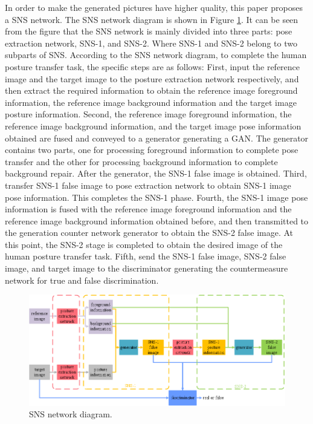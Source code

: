 In order to make the generated pictures have higher quality, this paper proposes a SNS network. The SNS network diagram is shown in Figure \ref{image02}. It can be seen from the figure that the SNS network is mainly divided into three parts: pose extraction network, SNS-1, and SNS-2. Where SNS-1 and SNS-2 belong to two subparts of SNS. According to the SNS network diagram, to complete the human posture transfer task, the specific steps are as follows: First, input the reference image and the target image to the posture extraction network respectively, and then extract the required information to obtain the reference image foreground information, the reference image background information and the target image posture information. Second, the reference image foreground information, the reference image background information, and the target image pose information obtained are fused and conveyed to a generator generating a GAN. The generator contains two parts, one for processing foreground information to complete pose transfer and the other for processing background information to complete background repair. After the generator, the SNS-1 false image is obtained. Third, transfer SNS-1 false image to pose extraction network to obtain SNS-1 image pose information. This completes the SNS-1 phase. Fourth, the SNS-1 image pose information is fused with the reference image foreground information and the reference image background information obtained before, and then transmitted to the generation counter network generator to obtain the SNS-2 false image. At this point, the SNS-2 stage is completed to obtain the desired image of the human posture transfer task. Fifth, send the SNS-1 false image, SNS-2 false image, and target image to the discriminator generating the countermeasure network for true and false discrimination.

\begin{figure}
	\centering
	\includegraphics[scale=1.25]{image02.png}
	\caption{ SNS network diagram.}
	\label{image02}
\end{figure}	

